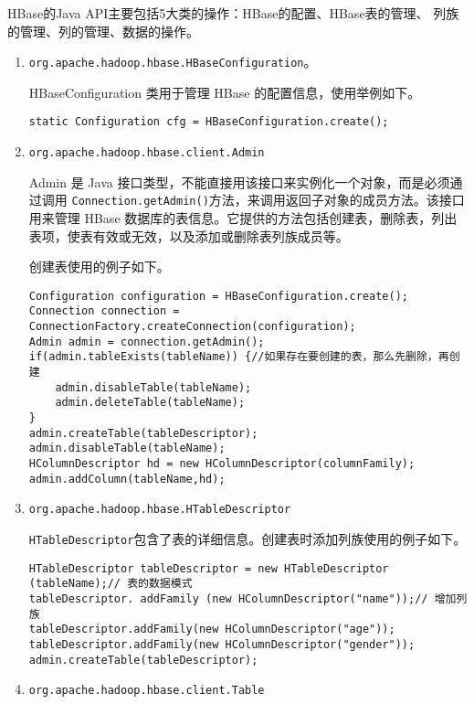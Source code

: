HBase的Java API主要包括5大类的操作：HBase的配置、HBase表的管理、
列族的管理、列的管理、数据的操作。

\begin{enumerate}[1)]
	\item \lstinline{org.apache.hadoop.hbase.HBaseConfiguration}。
	
	HBaseConfiguration 类用于管理 HBase 的配置信息，使用举例如下。

\begin{lstlisting}[style=customjava]
static Configuration cfg = HBaseConfiguration.create();
\end{lstlisting}

\item \lstinline{org.apache.hadoop.hbase.client.Admin}

Admin 是 Java 接口类型，不能直接用该接口来实例化一个对象，而是必须通过调用 \lstinline{Connection.getAdmin()}方法，来调用返回子对象的成员方法。该接口用来管理 HBase 数据库的表信息。它提供的方法包括创建表，删除表，列出表项，使表有效或无效，以及添加或删除表列族成员等。

创建表使用的例子如下。

\begin{lstlisting}[style=customjava]
Configuration configuration = HBaseConfiguration.create();
Connection connection = ConnectionFactory.createConnection(configuration);
Admin admin = connection.getAdmin();
if(admin.tableExists(tableName)) {//如果存在要创建的表，那么先删除，再创建
	admin.disableTable(tableName);
	admin.deleteTable(tableName);
}
admin.createTable(tableDescriptor);
admin.disableTable(tableName);
HColumnDescriptor hd = new HColumnDescriptor(columnFamily);
admin.addColumn(tableName,hd);
\end{lstlisting}

\item \lstinline{org.apache.hadoop.hbase.HTableDescriptor}

\lstinline{HTableDescriptor}包含了表的详细信息。创建表时添加列族使用的例子如下。

\begin{lstlisting}[style=customjava]
HTableDescriptor tableDescriptor = new HTableDescriptor (tableName);// 表的数据模式
tableDescriptor. addFamily (new HColumnDescriptor("name"));// 增加列族
tableDescriptor.addFamily(new HColumnDescriptor("age"));
tableDescriptor.addFamily(new HColumnDescriptor("gender"));
admin.createTable(tableDescriptor);
\end{lstlisting}

\item \lstinline{org.apache.hadoop.hbase.client.Table}


\end{enumerate}
